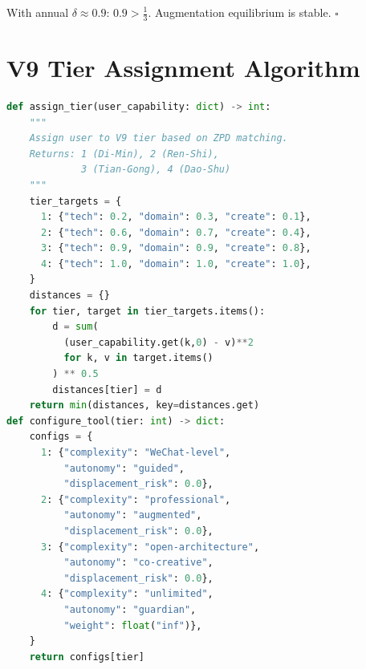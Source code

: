 \documentclass[conference]{IEEEtran}
\begin{document}
With annual $\delta \approx 0.9$: $0.9 > \frac{1}{3}$.
Augmentation equilibrium is stable. $\square$

\section{V9 Tier Assignment Algorithm}
\label{app:tier}

\begin{lstlisting}[language=Python,
  caption={ZPD-based tier assignment}]
def assign_tier(user_capability: dict) -> int:
    """
    Assign user to V9 tier based on ZPD matching.
    Returns: 1 (Di-Min), 2 (Ren-Shi),
             3 (Tian-Gong), 4 (Dao-Shu)
    """
    tier_targets = {
      1: {"tech": 0.2, "domain": 0.3, "create": 0.1},
      2: {"tech": 0.6, "domain": 0.7, "create": 0.4},
      3: {"tech": 0.9, "domain": 0.9, "create": 0.8},
      4: {"tech": 1.0, "domain": 1.0, "create": 1.0},
    }
    distances = {}
    for tier, target in tier_targets.items():
        d = sum(
          (user_capability.get(k,0) - v)**2
          for k, v in target.items()
        ) ** 0.5
        distances[tier] = d
    return min(distances, key=distances.get)
def configure_tool(tier: int) -> dict:
    configs = {
      1: {"complexity": "WeChat-level",
          "autonomy": "guided",
          "displacement_risk": 0.0},
      2: {"complexity": "professional",
          "autonomy": "augmented",
          "displacement_risk": 0.0},
      3: {"complexity": "open-architecture",
          "autonomy": "co-creative",
          "displacement_risk": 0.0},
      4: {"complexity": "unlimited",
          "autonomy": "guardian",
          "weight": float("inf")},
    }
    return configs[tier]
\end{lstlisting}
\end{document}
